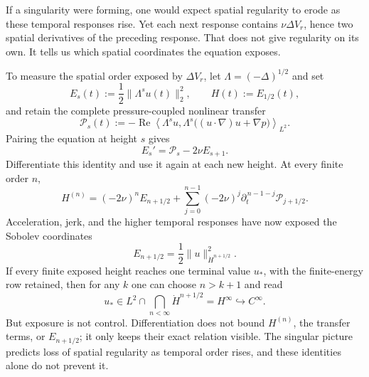 If a singularity were forming, one would expect spatial regularity to erode as
these temporal responses rise.  Yet each next response contains
\(\nu\Delta V_r\), hence two spatial derivatives of the preceding response.
That does not give regularity on its own.  It tells us which spatial
coordinates the equation exposes.

To measure the spatial order exposed by \(\Delta V_r\), let
\(\Lambda=(-\Delta)^{1/2}\) and set
\[
 E_s(t):=\frac12\|\Lambda^su(t)\|_2^2,
 \qquad
 H(t):=E_{1/2}(t),
\]
and retain the complete pressure-coupled nonlinear transfer
\[
 \mathcal P_s(t)
 :=-\operatorname{Re}\left\langle
 \Lambda^su,
 \Lambda^s\bigl((u\!\cdot\nabla)u+\nabla p\bigr)
 \right\rangle_{L^2}.
\]
Pairing the equation at height \(s\) gives
\[
 E_s'=\mathcal P_s-2\nu E_{s+1}.
\]
Differentiate this identity and use it again at each new height.  At every
finite order \(n\),
\[
 H^{(n)}
 =(-2\nu)^nE_{n+1/2}
 +\sum_{j=0}^{n-1}(-2\nu)^j
   \partial_t^{\,n-1-j}\mathcal P_{j+1/2}.
\]
Acceleration, jerk, and the higher temporal responses have now exposed the
Sobolev coordinates
\[
 E_{n+1/2}
 =\frac12\|u\|_{\dot H^{n+1/2}}^2.
\]
If every finite exposed height reaches one terminal value \(u_*\), with the
finite-energy row retained, then for any \(k\) one can choose \(n>k+1\) and
read
\[
 u_*\in L^2\cap\bigcap_{n<\infty}\dot H^{n+1/2}
 =H^\infty
 \hookrightarrow C^\infty.
\]
But exposure is not control.  Differentiation does not bound
\(H^{(n)}\), the transfer terms, or \(E_{n+1/2}\); it only keeps their exact
relation visible.  The singular picture predicts loss of spatial regularity
as temporal order rises, and these identities alone do not prevent it.

